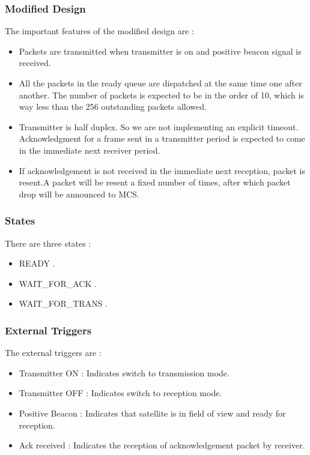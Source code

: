 \documentclass{beamer}
\begin{document}
\begin{frame}
\frametitle{Modified Design}
The important features of the modified design are :
\begin{itemize}
 \item Packets are transmitted when transmitter is on and positive beacon signal is
received.
\item  All the packets in the ready queue are dispatched at the same time one after
another. The number of packets is expected to be in the order of 10, which is
way less than the 256 outstanding packets allowed.

\item  Transmitter is half duplex. So we are not implementing an explicit timeout.
Acknowledgment for a frame sent in a transmitter period is expected to
come in the immediate next receiver period.
\item If acknowledgement is not received in the immediate next reception, packet
is resent.A packet will be resent a fixed number of times, after which packet
drop will be announced to MCS.

\end{itemize}
\end{frame}

\begin{frame}
\frametitle{States}
There are three states :
\begin{itemize}
\item READY .
\item WAIT\_FOR\_ACK .
\item WAIT\_FOR\_TRANS . 
\end{itemize}


\end{frame}

\begin{frame}
\frametitle{External Triggers}
The external triggers are :
\begin{itemize}
\item Transmitter ON : Indicates switch to transmission mode.
\item Transmitter OFF : Indicates switch to reception mode.
\item Positive Beacon : Indicates that satellite is in field of view and ready for reception.
\item Ack received : Indicates the reception of acknowledgement packet by receiver.

\end{itemize}
\end{frame}
\end{document}
